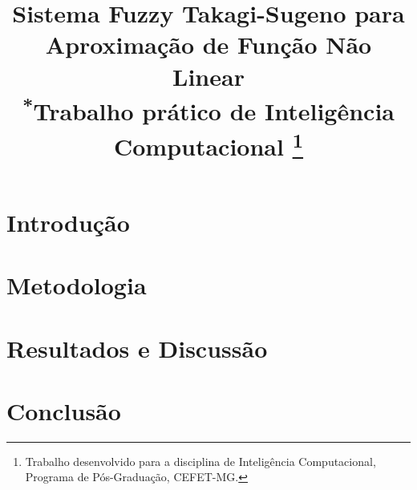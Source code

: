 \documentclass[conference]{IEEEtran}
\begin{document}
\title{Sistema Fuzzy Takagi-Sugeno para Aproximação de Função Não Linear\\
{\footnotesize \textsuperscript{*}Trabalho prático de Inteligência Computacional}
\thanks{Trabalho desenvolvido para a disciplina de Inteligência Computacional, Programa de Pós-Graduação, CEFET-MG.}
}

\author{
\and
{}
}

\maketitle

\renewcommand{\abstractname}{Resumo}
\begin{abstract}

\end{abstract}

\renewcommand{\IEEEkeywordsname}{Palavras-chave}
\begin{IEEEkeywords}

\end{IEEEkeywords}

\section{Introdução}


\section{Metodologia}


\section{Resultados e Discussão}


\section{Conclusão}


\renewcommand{\refname}{Referências}


\end{document}
